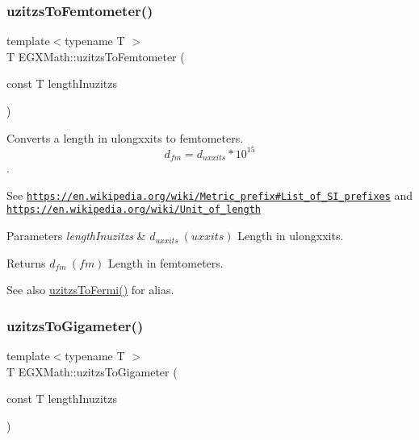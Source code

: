 \subsubsection{\texorpdfstring{uzitzs\+To\+Femtometer()}{uzitzsToFemtometer()}}
{\footnotesize\ttfamily template$<$typename T $>$ \\
T E\+G\+X\+Math\+::uzitzs\+To\+Femtometer (\begin{DoxyParamCaption}\item[{const T}]{length\+Inuzitzs }\end{DoxyParamCaption})}



Converts a length in ulongxxits to femtometers. \[ d_{fm}=d_{uxxits} * 10^{15} \]. 

See \href{https://en.wikipedia.org/wiki/Metric_prefix#List_of_SI_prefixes}{\tt https\+://en.\+wikipedia.\+org/wiki/\+Metric\+\_\+prefix\#\+List\+\_\+of\+\_\+\+S\+I\+\_\+prefixes} and \href{https://en.wikipedia.org/wiki/Unit_of_length}{\tt https\+://en.\+wikipedia.\+org/wiki/\+Unit\+\_\+of\+\_\+length} 
\begin{DoxyParams}{Parameters}
{\em length\+Inuzitzs} & $ d_{uxxits}\ (uxxits)$ Length in ulongxxits. \\
\hline
\end{DoxyParams}
\begin{DoxyReturn}{Returns}
$ d_{fm}\ (fm)$ Length in femtometers. 
\end{DoxyReturn}
\begin{DoxySeeAlso}{See also}
\mbox{\hyperlink{group___e_g_x_math-_conversions-_length_conversions-uzitzs-_non-_s_i_ga920cd8aae6bc9f70faa49a6a5c988040}{uzitzs\+To\+Fermi()}} for alias. 
\end{DoxySeeAlso}
\mbox{\label{group___e_g_x_math-_conversions-_length_conversions-uzitzs-_s_i_ga15833fbe62cb7d741b808bc63a21df55}} 
\subsubsection{\texorpdfstring{uzitzs\+To\+Gigameter()}{uzitzsToGigameter()}}
{\footnotesize\ttfamily template$<$typename T $>$ \\
T E\+G\+X\+Math\+::uzitzs\+To\+Gigameter (\begin{DoxyParamCaption}\item[{const T}]{length\+Inuzitzs }\end{DoxyParamCaption})}



